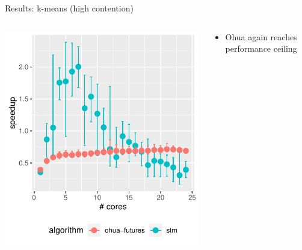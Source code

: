 \documentclass[aspectratio=169, usenames, dvipsnames]{beamer}
\begin{document}
\begin{frame}{Results: k-means (high contention)}
    \begin{columns}%
        \begin{column}{0.5\textwidth}
            \centering
            \includegraphics[width=\textwidth,height=.65\textheight,keepaspectratio]{img/results/kmeans-high++}
        \end{column}%
        \begin{column}{0.5\textwidth}
            \begin{itemize}
                \item<2-> Ohua again reaches performance ceiling
            \end{itemize}
        \end{column}
    \end{columns}
\end{frame}
\end{document}
